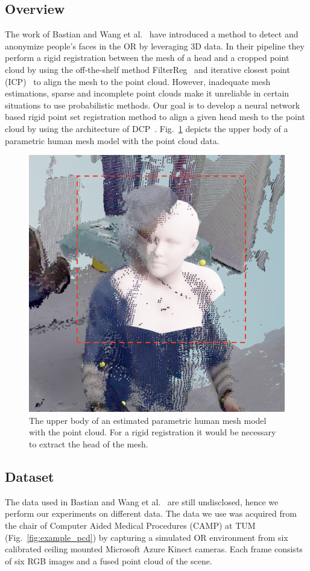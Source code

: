 \documentclass[a4paper,pagesize 10pt]{scrartcl}
\begin{document}
\subsection{Overview}
The work of Bastian and Wang et al.~\cite{disguisor} have introduced a method to detect and anonymize people's faces in the OR by leveraging 3D data.
In their pipeline they perform a rigid registration between the mesh of a head and a cropped point cloud by using the off-the-shelf method FilterReg~\cite{filterreg} and iterative closest point (ICP)~\cite{icp} to align the mesh to the point cloud. 
However, inadequate mesh estimations, sparse and incomplete point clouds make it unreliable in certain situations to use probabilistic methods.
Our goal is to develop a neural network based rigid point set registration method to align a given head mesh to the point cloud by using the architecture of DCP~\cite{dcp}.
Fig.~\ref{fig:example_mesh} depicts the upper body of a parametric human mesh model with the point cloud data.

\begin{figure}[!ht]
    \centering
    \includegraphics[width=0.65\columnwidth]{figures/issue_pointcloud.png}
    \caption{The upper body of an estimated parametric human mesh model with the point cloud. For a rigid registration it would be necessary to extract the head of the mesh.}
    \label{fig:example_mesh}
\end{figure}

\subsection{Dataset}
The data used in Bastian and Wang et al.~\cite{disguisor} are still undisclosed, hence we perform our experiments on different data.
The data we use was acquired from the chair of Computer Aided Medical Procedures (CAMP) at TUM (Fig.~\ref{fig:example_pcd}) by capturing a simulated OR environment from six calibrated ceiling mounted Microsoft Azure Kinect cameras.
Each frame consists of six RGB images and a fused point cloud of the scene.
\end{document}
